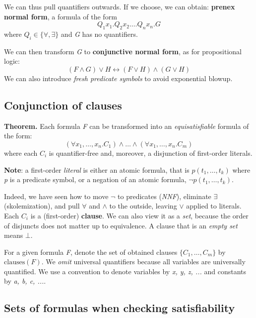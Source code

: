 \documentclass[11pt]{article}
\begin{document}
We can thus pull quantifiers outwards. If we choose, we can obtain: \textbf{prenex normal form}, a formula of the form
\[
    Q_1 x_1. Q_2 x_2. \dots Q_n x_n. G
\]
where $Q_i \in \{\forall, \exists\}$ and \textit{G} has no quantifiers.

We can then transform \textit{G} to \textbf{conjunctive normal form}, as for propositional logic:
\[
    (F \land G) \lor H \leftrightarrow (F \lor H) \land (G \lor H)
\]
We can also introduce \textit{fresh predicate symbols} to avoid exponential blowup.

\subsection*{Conjunction of clauses}

\begin{tcolorbox}[
    enhanced,
    frame hidden,
    borderline west={2pt}{0pt}{black},
    boxsep=5pt,
    left=8pt
]
\textbf{Theorem.} Each formula \textit{F} can be transformed into an \textit{equisatisfiable} formula of the form:
\[
    (\forall x_1, \dots, x_n. C_1) \land \dots \land (\forall x_1, \dots, x_n. C_m)
\]
where each $C_i$ is quantifier-free and, moreover, a disjunction of first-order literals.
\end{tcolorbox}

\textbf{Note}: a first-order \textit{literal} is either an atomic formula, that is $p(t_1, \dots, t_k)$ where \textit{p} is a predicate symbol, or a negation of an atomic formula, $\neg p(t_1, \dots, t_k)$.

Indeed, we have seen how to move $\neg$ to predicates (\textit{NNF}), eliminate $\exists$ (skolemization), and pull $\forall$ and $\land$ to the outside, leaving $\lor$ applied to literals. Each $C_i$ is a (first-order) \textbf{clause}. We can also view it as a \textit{set}, because the order of disjuncts does not matter up to equivalence. A clause that is an \textit{empty set} means $\bot$.

For a given formula \textit{F}, denote the set of obtained clauses $\{C_1, \dots, C_m\}$ by $\mathrm{clauses}(F)$. We \textit{omit} universal quantifiers because all variables are universally quantified. We use a convention to denote variables by \textit{x, y, z, ...} and constants by \textit{a, b, c, ...}.

\subsection*{Sets of formulas when checking satisfiability}
\end{document}
